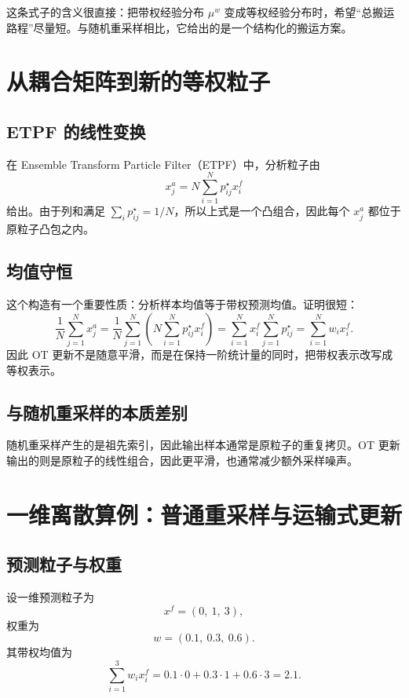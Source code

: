 \documentclass[12pt,a4paper]{ctexart}
\begin{document}
这条式子的含义很直接：把带权经验分布 \(\mu^w\) 变成等权经验分布时，希望“总搬运路程”尽量短。与随机重采样相比，它给出的是一个结构化的搬运方案。

\section{从耦合矩阵到新的等权粒子}

\subsection{ETPF 的线性变换}

在 Ensemble Transform Particle Filter（ETPF）中，分析粒子由
\[
x_j^a = N \sum_{i=1}^N p_{ij}^\star x_i^f
\]
给出。由于列和满足 \(\sum_i p_{ij}^\star = 1/N\)，所以上式是一个凸组合，因此每个 \(x_j^a\) 都位于原粒子凸包之内。

\subsection{均值守恒}

这个构造有一个重要性质：分析样本均值等于带权预测均值。证明很短：
\[
\frac1N \sum_{j=1}^N x_j^a
=
\frac1N \sum_{j=1}^N \left(
N \sum_{i=1}^N p_{ij}^\star x_i^f
\right)
=
\sum_{i=1}^N x_i^f \sum_{j=1}^N p_{ij}^\star
=
\sum_{i=1}^N w_i x_i^f.
\]
因此 OT 更新不是随意平滑，而是在保持一阶统计量的同时，把带权表示改写成等权表示。

\subsection{与随机重采样的本质差别}

随机重采样产生的是祖先索引，因此输出样本通常是原粒子的重复拷贝。OT 更新输出的则是原粒子的线性组合，因此更平滑，也通常减少额外采样噪声。

\section{一维离散算例：普通重采样与运输式更新}

\subsection{预测粒子与权重}

设一维预测粒子为
\[
x^f = (0,\ 1,\ 3),
\]
权重为
\[
w = (0.1,\ 0.3,\ 0.6).
\]
其带权均值为
\[
\sum_{i=1}^3 w_i x_i^f = 0.1 \cdot 0 + 0.3 \cdot 1 + 0.6 \cdot 3 = 2.1.
\]
\end{document}
